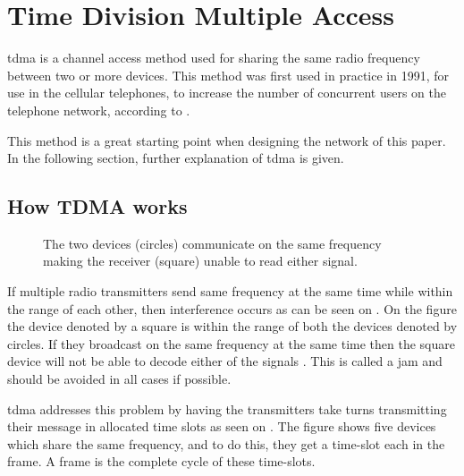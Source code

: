 \chapter{Time Division Multiple Access}\label{TDMA}

\gls{tdma} is a channel access method used for sharing the same radio frequency between two or more devices.
This method was first used in practice in 1991, for use in the cellular telephones, to increase the number of concurrent users on the telephone network, according to \citet{networkencyclopedia2013time}.

This method is a great starting point when designing the network of this paper.
In the following section, further explanation of \gls{tdma} is given.

\section{How TDMA works}

\begin{SCfigure}
    \vspace{-10pt}
    \centering
    \footnotesize
    \resizebox{0.5\linewidth}{!}{%
}
    \caption{The two devices (circles) communicate on the same frequency making the receiver (square) unable to read either signal.}
    \label{fig:rangediagram}
    \vspace{-10pt}    
\end{SCfigure}

If multiple radio transmitters send same frequency at the same time while within the range of each other, then interference occurs as can be seen on . 
On the figure the device denoted by a square is within the range of both the devices denoted by circles. 
If they broadcast on the same frequency at the same time then the square device will not be able to decode either of the signals \cite{networkencyclopedia2013time, networkencyclopedia2013advanced}.
This is called a jam and should be avoided in all cases if possible.

\gls{tdma} addresses this problem by having the transmitters take turns transmitting their message in allocated time slots as seen on .
The figure shows five devices which share the same frequency, and to do this, they get a time-slot each in the frame.
A frame is the complete cycle of these time-slots.


